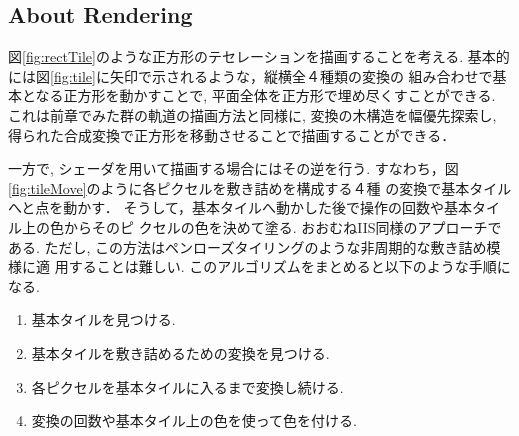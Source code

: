 \subsection{About Rendering}

図\ref{fig:rectTile}のような正方形のテセレーションを描画することを考える.
基本的には図\ref{fig:tile}に矢印で示されるような，縦横全４種類の変換の
組み合わせで基本となる正方形を動かすことで, 平面全体を正方形で埋め尽くすことができる.
これは前章でみた群の軌道の描画方法と同様に, 変換の木構造を幅優先探索し,
得られた合成変換で正方形を移動させることで描画することができる．

一方で, シェーダを用いて描画する場合にはその逆を行う.
すなわち，図\ref{fig:tileMove}のように各ピクセルを敷き詰めを構成する４種
の変換で基本タイルへと点を動かす．
そうして，基本タイルへ動かした後で操作の回数や基本タイル上の色からそのピ
クセルの色を決めて塗る.
おおむねIIS同様のアプローチである.
ただし, この方法はペンローズタイリングのような非周期的な敷き詰め模様に適
用することは難しい.
このアルゴリズムをまとめると以下のような手順になる.
\begin{enumerate}
 \item 基本タイルを見つける.
 \item 基本タイルを敷き詰めるための変換を見つける.
 \item 各ピクセルを基本タイルに入るまで変換し続ける.
 \item 変換の回数や基本タイル上の色を使って色を付ける.
\end{enumerate}

